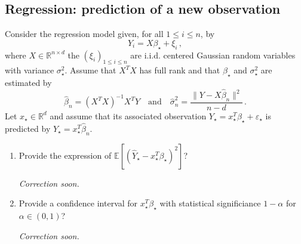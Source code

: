 \documentclass[a4paper,10pt,fleqn]{article}
\newcommand{\eqsp}{\,}
\newcommand{\rset}{\ensuremath{\mathbb{R}}}
\newcommand{\1}{\ensuremath{\mathbbm{1}}}
\newcommand{\bE}{\mathbb{E}}
\begin{document}
\subsection*{Regression: prediction of a new observation}
Consider the regression model given, for all $1\leqslant i\leqslant n$, by
$$
Y_{i} = X\beta_{\star}+ \xi_{i}\eqsp,
$$
where $X\in\rset^{n\times d}$ the $(\xi_{i})_{1\leqslant i \leqslant n}$ are i.i.d. centered Gaussian random variables with variance $\sigma_{\star}^2$. Assume that $X^TX$ has full rank and that $\beta_\star$ and $\sigma_{\star}^2$ are estimated by 
$$
\widehat \beta_n = (X^TX)^{-1}X^TY\quad\mathrm{and}\quad \widehat \sigma^2_n =\frac{\|Y - X\widehat \beta_n \|^2}{n-d}\eqsp.
$$
Let $x_\star \in\rset^d$ and assume that its associated observation $Y_\star = x_\star^T\beta_\star + \varepsilon_\star$ is predicted by $\widehat Y_\star = x_\star^T\widehat \beta_n$.
\begin{enumerate}
\item  Provide the expression of $\bE[(\widehat Y_\star - x_\star^T\beta_\star)^2]$?

\vspace{.2cm}

{\em
Correction soon.
}

\item  Provide a confidence interval for $x_\star^T\beta_\star$ with statistical significiance $1-\alpha$ for $\alpha\in(0,1)$?

\vspace{.2cm}

{\em
Correction soon.
}
\end{enumerate}
\end{document}
